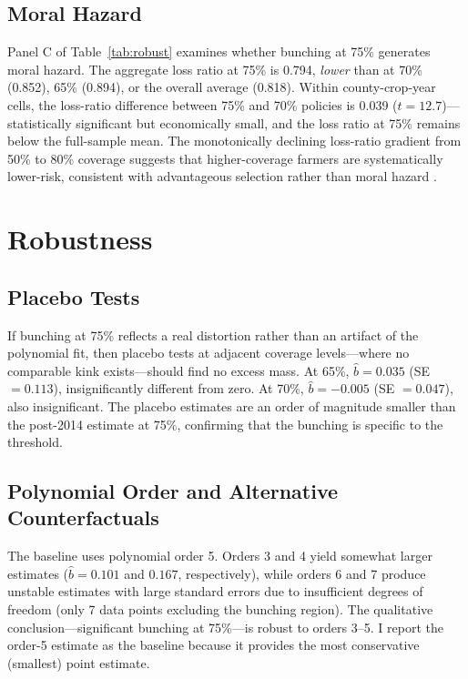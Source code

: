 \documentclass[12pt]{article}
\begin{document}
\subsection{Moral Hazard}

Panel C of Table~\ref{tab:robust} examines whether bunching at 75\% generates moral hazard. The aggregate loss ratio at 75\% is 0.794, \textit{lower} than at 70\% (0.852), 65\% (0.894), or the overall average (0.818). Within county-crop-year cells, the loss-ratio difference between 75\% and 70\% policies is 0.039 ($t = 12.7$)---statistically significant but economically small, and the loss ratio at 75\% remains below the full-sample mean. The monotonically declining loss-ratio gradient from 50\% to 80\% coverage suggests that higher-coverage farmers are systematically lower-risk, consistent with advantageous selection rather than moral hazard \citep{just2003}.


\section{Robustness}

\subsection{Placebo Tests}

If bunching at 75\% reflects a real distortion rather than an artifact of the polynomial fit, then placebo tests at adjacent coverage levels---where no comparable kink exists---should find no excess mass. At 65\%, $\hat{b} = 0.035$ (SE $= 0.113$), insignificantly different from zero. At 70\%, $\hat{b} = -0.005$ (SE $= 0.047$), also insignificant. The placebo estimates are an order of magnitude smaller than the post-2014 estimate at 75\%, confirming that the bunching is specific to the threshold.

\subsection{Polynomial Order and Alternative Counterfactuals}

The baseline uses polynomial order 5. Orders 3 and 4 yield somewhat larger estimates ($\hat{b} = 0.101$ and $0.167$, respectively), while orders 6 and 7 produce unstable estimates with large standard errors due to insufficient degrees of freedom (only 7 data points excluding the bunching region). The qualitative conclusion---significant bunching at 75\%---is robust to orders 3--5. I report the order-5 estimate as the baseline because it provides the most conservative (smallest) point estimate.
\end{document}
